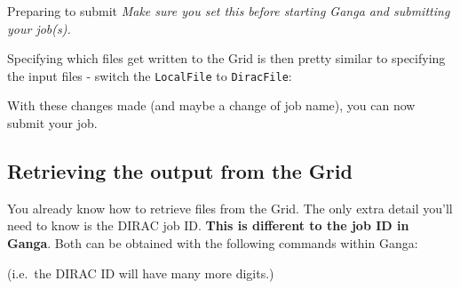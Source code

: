 \begin{Shaded}
\begin{Highlighting}[]
\NormalTok{[}\NormalTok{]}
 
\end{Highlighting}
\end{Shaded}

\begin{warningbox}{Preparing to submit}
\emph{Make sure you set this before starting Ganga and submitting your job(s).}
\end{warningbox}

Specifying which files get written to the Grid is then pretty similar to
specifying the input files - switch the \texttt{LocalFile} to
\texttt{DiracFile}:

\begin{Shaded}
\begin{Highlighting}[]
 \NormalTok{= [ DiracFile(}\NormalTok{) ]}
\end{Highlighting}
\end{Shaded}

With these changes made (and maybe a change of job name), you can now
submit your job.

\subsection{Retrieving the output from the Grid}
\label{retrieving-the-output-from-the-grid}
You already know how to
retrieve files from the Grid. The only extra detail you'll need to know
is the DIRAC job ID. \textbf{This is different to the job ID in Ganga}.
Both can be obtained with the following commands within Ganga:

\begin{Shaded}
\begin{Highlighting}[]
 
 

 
 
\end{Highlighting}
\end{Shaded}

(i.e.~the DIRAC ID will have many more digits.)


